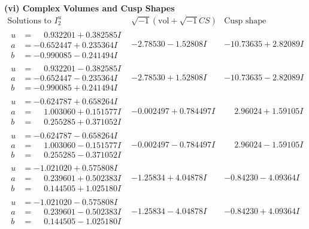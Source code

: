\documentclass[1p]{elsarticle_modified}
\theoremstyle{definition}
\newcommand{\I}{\sqrt{-1}}
\begin{document}
\newpage\flushleft \textbf{(vi) Complex Volumes and Cusp Shapes}
$$\begin{array}{c|c|c}  
\text{Solutions to }I^u_{2}& \I (\text{vol} + \sqrt{-1}CS) & \text{Cusp shape}\\
 \hline 
\begin{aligned}
u &= \phantom{-}0.932201 + 0.382585 I \\
a &= -0.652447 + 0.235364 I \\
b &= -0.990085 - 0.241494 I\end{aligned}
 & -2.78530 - 1.52808 I & -10.73635 + 2.82089 I \\ \hline\begin{aligned}
u &= \phantom{-}0.932201 - 0.382585 I \\
a &= -0.652447 - 0.235364 I \\
b &= -0.990085 + 0.241494 I\end{aligned}
 & -2.78530 + 1.52808 I & -10.73635 - 2.82089 I \\ \hline\begin{aligned}
u &= -0.624787 + 0.658264 I \\
a &= \phantom{-}1.003060 + 0.151577 I \\
b &= \phantom{-}0.255285 + 0.371052 I\end{aligned}
 & -0.002497 + 0.784497 I & \phantom{-}2.96024 + 1.59105 I \\ \hline\begin{aligned}
u &= -0.624787 - 0.658264 I \\
a &= \phantom{-}1.003060 - 0.151577 I \\
b &= \phantom{-}0.255285 - 0.371052 I\end{aligned}
 & -0.002497 - 0.784497 I & \phantom{-}2.96024 - 1.59105 I \\ \hline\begin{aligned}
u &= -1.021020 + 0.575808 I \\
a &= \phantom{-}0.239601 + 0.502383 I \\
b &= \phantom{-}0.144505 + 1.025180 I\end{aligned}
 & -1.25834 + 4.04878 I & -0.84230 - 4.09364 I \\ \hline\begin{aligned}
u &= -1.021020 - 0.575808 I \\
a &= \phantom{-}0.239601 - 0.502383 I \\
b &= \phantom{-}0.144505 - 1.025180 I\end{aligned}
 & -1.25834 - 4.04878 I & -0.84230 + 4.09364 I \\ \hline\begin{aligned}

\end{aligned}
\end{array}$$
\end{document}
